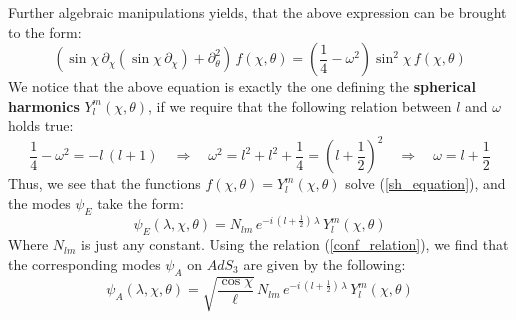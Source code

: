%
%
Further algebraic manipulations yields, that the above expression can be brought to the form:
%
%
\begin{equation}\label{sh_equation}
\left(
\sin\chi \, \partial_{\chi} \left( \sin \chi \, \partial_{\chi} \right)
+ \partial^2_{\theta}
\right) \, f(\chi, \theta)
=
\left( \frac{1}{4} - \omega^2 \right) \sin^2 \chi \, f(\chi, \theta)
\end{equation}
%
%
We notice that the above equation is exactly the one defining the \textbf{spherical harmonics} $Y_l^m(\chi, \theta)$, if we require that the following relation between $l$ and $\omega$ holds true:
%
%
\begin{equation}
\frac{1}{4} - \omega^2 = -l \, (l + 1)
\quad \Rightarrow \quad
\omega^2 = l^2 + l^2 + \frac{1}{4} = \left( l + \frac{1}{2} \right)^2
\quad \Rightarrow \quad
\omega = l + \frac{1}{2}
\end{equation}
%
%
Thus, we see that the functions $f(\chi, \theta) = Y_l^m(\chi, \theta)$ solve (\ref{sh_equation}), and the modes $\psi_E$ take the form:
%
%
\begin{equation}\label{Modes_ESU}
\psi_E(\lambda, \chi, \theta) = N_{lm} \, e^{-i \, \left( l + \frac{1}{2} \right) \, \lambda} \, Y_l^m(\chi, \theta)
\end{equation}
%
%
%
%
%
%
%
%
%
%
Where $N_{lm}$ is just any constant. Using the relation (\ref{conf_relation}), we find that the corresponding modes $\psi_A$ on $AdS_3$ are given by the following:
%
\begin{equation}\label{Modes_AdS}
\psi_A(\lambda, \chi, \theta)
= \sqrt{\frac{\cos \chi}{\ell}} \, N_{lm} \, e^{-i \, \left( l + \frac{1}{2} \right) \, \lambda} \, Y_l^m(\chi, \theta)
\end{equation}
